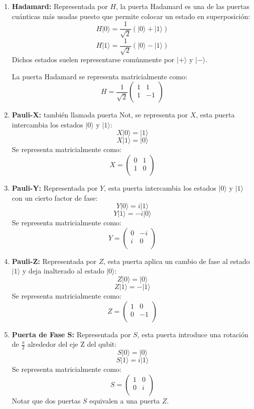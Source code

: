 \begin{enumerate}
    \item \textbf{Hadamard:} Representada por $H$, la puerta Hadamard es una de las puertas cuánticas más usadas puesto que permite colocar un estado en superposición:
    $$H|0\rangle=\frac{1}{\sqrt2}(|0\rangle+|1\rangle)$$
    $$H|1\rangle=\frac{1}{\sqrt2}(|0\rangle-|1\rangle)$$
    Dichos estados suelen representarse comúnmente por $|+\rangle$ y $|-\rangle$.

    La puerta Hadamard se representa matricialmente como:
    $$H=\frac{1}{\sqrt2}\begin{pmatrix}
        1 & 1 \\
        1 & -1 \\
    \end{pmatrix}$$

    
    \item \textbf{Pauli-X:} también llamada puerta Not, se representa por $X$, esta puerta intercambia los estados $|0\rangle$ y $|1\rangle$:
    $$X|0\rangle = |1\rangle$$
    $$X|1\rangle = |0\rangle$$
    Se representa matricialmente como:
    $$X=\begin{pmatrix}
        0 & 1 \\
        1 & 0 \\
    \end{pmatrix}$$    

    \item \textbf{Pauli-Y:} Representada por $Y$, esta puerta intercambia los estados $|0\rangle$ y $|1\rangle$ con un cierto factor de fase:
    $$Y|0\rangle = i|1\rangle$$
    $$Y|1\rangle = -i|0\rangle$$
    Se representa matricialmente como:
    $$Y=\begin{pmatrix}
        0 & -i \\
        i & 0 \\
    \end{pmatrix}$$   

    
    \item \textbf{Pauli-Z:} Representada por $Z$, esta puerta aplica un cambio de fase al estado $|1\rangle$ y deja inalterado al estado $|0\rangle$:
    $$Z|0\rangle = |0\rangle$$
    $$Z|1\rangle = -|1\rangle$$
    Se representa matricialmente como:
    $$Z=\begin{pmatrix}
        1 & 0 \\
        0 & -1 \\
    \end{pmatrix}$$   


    \item \textbf{Puerta de Fase S:} Representada por $S$, esta puerta introduce una rotación de $\frac{\pi}{2}$ alrededor del eje Z del qubit:
    $$S|0\rangle = |0\rangle$$
    $$S|1\rangle = i|1\rangle$$
    Se representa matricialmente como:
    $$S=\begin{pmatrix}
        1 & 0 \\
        0 & i \\
    \end{pmatrix}$$   
    Notar que dos puertas $S$ equivalen a una puerta $Z$.
    


\end{enumerate}
